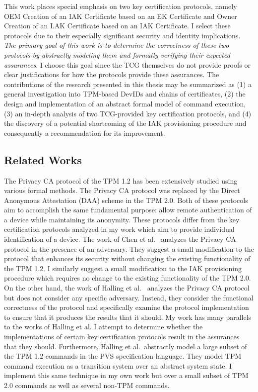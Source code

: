 \documentclass[runningheads]{llncs}
\begin{document}
This work places special emphasis on two key certification protocols, namely OEM Creation of an IAK Certificate based on an EK Certificate and Owner Creation of an LAK Certificate based on an IAK Certificate. I select these protocols due to their especially significant security and identity implications. \textit{The primary goal of this work is to determine the correctness of these two protocols by abstractly modeling them and formally verifying their expected assurances}. I choose this goal since the TCG themselves do not provide proofs or clear justifications for how the protocols provide these assurances. 
The contributions of the research presented in this thesis may be summarized as (1) a general investigation into TPM-based DevIDs and chains of certificates, (2) the design and implementation of an abstract formal model of command execution, (3) an in-depth analysis of two TCG-provided key certification protocols, and (4) the discovery of a potential shortcoming of the IAK provisioning procedure and consequently a recommendation for its improvement.

\subsection{Related Works}
The Privacy CA protocol of the TPM 1.2 has been extensively studied using various formal methods. The Privacy CA protocol was replaced by the Direct Anonymous Attestation (DAA) scheme in the TPM 2.0. Both of these protocols aim to accomplish the same fundamental purpose: allow remote authentication of a device while maintaining its anonymity. These protocols differ from the key certification protocols analyzed in my work which aim to provide individual identification of a device.
The work of Chen et al.\ \cite{PrivacyCAAnalysis-Chen} analyzes the Privacy CA protocol in the presence of an adversary. They suggest a small modification to the protocol that enhances its security without changing the existing functionality of the TPM 1.2. I similarly suggest a small modification to the IAK provisioning procedure which requires no change to the existing functionality of the TPM 2.0.
On the other hand, the work of Halling et al.\ \cite{PrivacyCAAnalysis-Hall,TPM12Model} analyzes the Privacy CA protocol but does not consider any specific adversary. Instead, they consider the functional correctness of the protocol and specifically examine the protocol implementation to ensure that it produces the results that it should.  
My work has many parallels to the works of Halling et al. 
I attempt to determine whether the implementations of certain key certification protocols result in the assurances that they should.
Furthermore, Halling et al.\ abstractly model a large subset of the TPM 1.2 commands in the PVS specification language. They model TPM command execution as a transition system over an abstract system state. I implement this same technique in my own work but over a small subset of TPM 2.0 commands as well as several non-TPM commands. 
\end{document}
